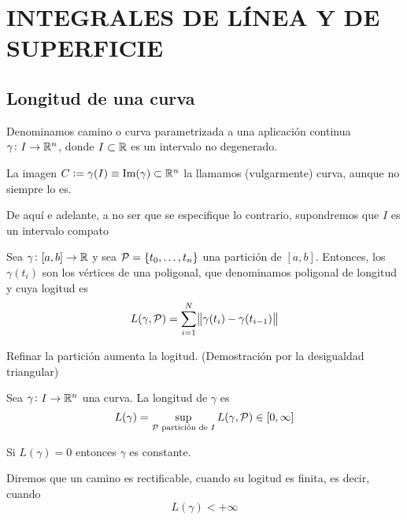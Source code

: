 \chapter{INTEGRALES DE LÍNEA Y DE SUPERFICIE}

\section{Longitud de una curva}

\begin{defi}
    Denominamos camino o curva parametrizada a una aplicación continua $\gamma \colon I \to \mathbb{R}^n$, donde
    $I \subset \mathbb{R}$ es un intervalo no degenerado.

    La imagen $C := \gamma(I) \equiv \operatorname{Im}(\gamma) \subset \mathbb{R}^n$ la llamamos (vulgarmente) curva, aunque no
    siempre lo es.
\end{defi}

\begin{obs*}
    De aquí e adelante, a no ser que se especifique lo contrario, supondremos que $I$ es un intervalo compato
\end{obs*}

\begin{defi}
    Sea $\gamma \colon [a, b] \to \mathbb{R}$ y  sea $\mathcal{P} = \left\{t_0, \dots, t_n\right\}$ una partición de $[a, b]$.
    Entonces, los $\gamma(t_i)$ son los v\'ertices de una poligonal, que denominamos poligonal de longitud y cuya logitud es
    \[
        L(\gamma, \mathcal{P}) = \sum^N_{i=1} \norm{\gamma(t_i) - \gamma(t_{i-1})}
    \]
\end{defi}
\begin{obs*}
    Refinar la partición aumenta la logitud. (Demostración por la desigualdad triangular)
\end{obs*}

\begin{defi}
    Sea $\gamma \colon I \to \mathbb{R}^n$ una curva. La longitud de $\gamma$ es
    \[
        L(\gamma) = \sup_{\mathcal{P} \text{ partición de } I} L(\gamma, \mathcal{P}) \in [0, \infty]
    \]
\end{defi}

\begin{obs*}
    Si $L(\gamma) = 0$ entonces $\gamma$ es constante.
\end{obs*}

\begin{defi}
    Diremos que un camino es rectificable, cuando su logitud es finita, es decir, cuando
    \[
        L(\gamma) < +\infty
    \]
\end{defi}

